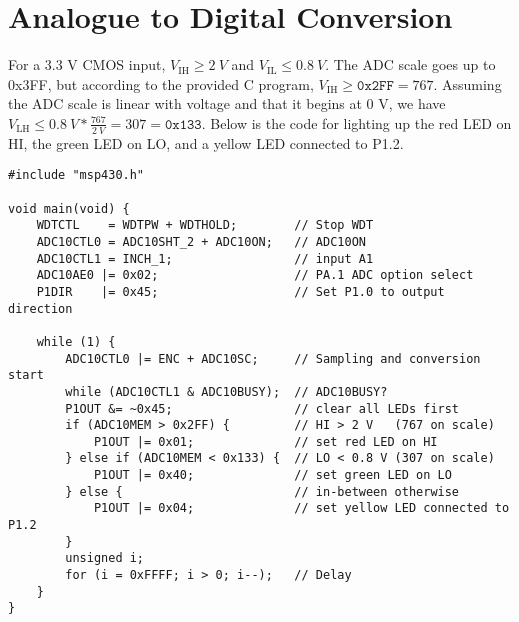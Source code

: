 \documentclass[letterpaper]{article}
\begin{document}
	\section{Analogue to Digital Conversion}
		For a 3.3 V CMOS input, $V_{\textrm{IH}} \ge \SI{2}{V}$ and $V_{\textrm{IL}} \le \SI{0.8}{V}$. The ADC scale goes up to 0x3FF, but according to the provided C program, $V_{\textrm{IH}} \ge \texttt{0x2FF} = 767$. Assuming the ADC scale is linear with voltage and that it begins at 0 V, we have $V_{\textrm{LH}} \le \SI{0.8}{V} * \frac{767}{\SI{2}{V}} = 307 = \texttt{0x133}.$ Below is the code for lighting up the red LED on HI, the green LED on LO, and a yellow LED connected to P1.2.
		\begin{verbatim}
#include "msp430.h"

void main(void) {
    WDTCTL    = WDTPW + WDTHOLD;        // Stop WDT
    ADC10CTL0 = ADC10SHT_2 + ADC10ON;   // ADC10ON
    ADC10CTL1 = INCH_1;                 // input A1
    ADC10AE0 |= 0x02;                   // PA.1 ADC option select
    P1DIR    |= 0x45;                   // Set P1.0 to output direction
    
    while (1) {
        ADC10CTL0 |= ENC + ADC10SC;     // Sampling and conversion start
        while (ADC10CTL1 & ADC10BUSY);  // ADC10BUSY?
        P1OUT &= ~0x45;                 // clear all LEDs first
        if (ADC10MEM > 0x2FF) {         // HI > 2 V   (767 on scale)
            P1OUT |= 0x01;              // set red LED on HI
        } else if (ADC10MEM < 0x133) {  // LO < 0.8 V (307 on scale)
            P1OUT |= 0x40;              // set green LED on LO
        } else {                        // in-between otherwise
            P1OUT |= 0x04;              // set yellow LED connected to P1.2
        }
        unsigned i;
        for (i = 0xFFFF; i > 0; i--);   // Delay
    }
}
		\end{verbatim}
	
\end{document}
